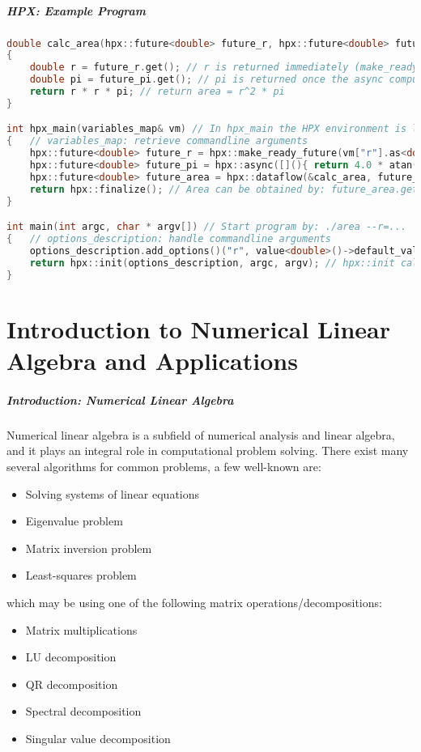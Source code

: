 \begin{frame}[fragile]
\frametitle{HPX: Example Program}
\begin{lstlisting}[language=C++]
double calc_area(hpx::future<double> future_r, hpx::future<double> future_pi)
{
    double r = future_r.get(); // r is returned immediately (make_ready_future)
    double pi = future_pi.get(); // pi is returned once the async computation finishes
    return r * r * pi; // return area = r^2 * pi
}

int hpx_main(variables_map& vm) // In hpx_main the HPX environment is loaded
{   // variables_map: retrieve commandline arguments
    hpx::future<double> future_r = hpx::make_ready_future(vm["r"].as<double>());
    hpx::future<double> future_pi = hpx::async([](){ return 4.0 * atan(1.0); });
    hpx::future<double> future_area = hpx::dataflow(&calc_area, future_r, future_pi);
    return hpx::finalize(); // Area can be obtained by: future_area.get()
}

int main(int argc, char * argv[]) // Start program by: ./area --r=...
{   // options_description: handle commandline arguments
    options_description.add_options()("r", value<double>()->default_value(1.0), "Radius: r");
    return hpx::init(options_description, argc, argv); // hpx::init calls hpx_main
}
\end{lstlisting}
\end{frame}

\part{Introduction to Numerical Linear Algebra and Applications}
\makepart

\begin{frame}
\frametitle{Introduction: Numerical Linear Algebra}
Numerical linear algebra is a subfield of numerical analysis and linear algebra,
and it plays an integral role in computational problem solving.
There exist many several algorithms for common problems, a few well-known are:
\begin{itemize}
 \item Solving systems of linear equations
 \item Eigenvalue problem
 \item Matrix inversion problem
 \item Least-squares problem
\end{itemize}
which may be using one of the following matrix operations/decompositions:
\begin{itemize}
 \item Matrix multiplications
 \item LU decomposition
 \item QR decomposition
 \item Spectral decomposition
 \item Singular value decomposition
\end{itemize}
\end{frame}

